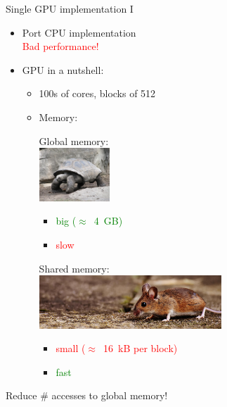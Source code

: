 \documentclass{beamer}
\begin{document}
\begin{frame}{Single GPU implementation I}
\begin{itemize}
    \item Port CPU implementation\\ \pause
        \textcolor{red}{\frownie{} Bad performance!} \pause
    \item GPU in a nutshell:\\ \pause
        \begin{itemize}
            \item 100s of cores, blocks of 512 \pause
            \item Memory:\\ \pause
                \begin{minipage}{0.4\textwidth}
                    Global memory:\\
                    \includegraphics[keepaspectratio=true, height=2cm]{images/big_turtle.jpg}
                    \begin{itemize}
                        \item \textcolor{green}{big ($\approx$~4~GB)}
                        \item \textcolor{red}{slow}
                    \end{itemize}
                \end{minipage} \pause
                \begin{minipage}{0.4\textwidth}
                    Shared memory:\\
                    \includegraphics[keepaspectratio=true, height=2cm]{images/mouse.jpg}
                    \begin{itemize}
                        \item \textcolor{red}{small ($\approx$~16~kB per block)}
                        \item \textcolor{green}{fast}
                    \end{itemize}
                \end{minipage} \pause
        \end{itemize}
\end{itemize}
\begin{highlightbox}
    Reduce \# accesses to global memory!
\end{highlightbox}
\end{frame}
\end{document}
